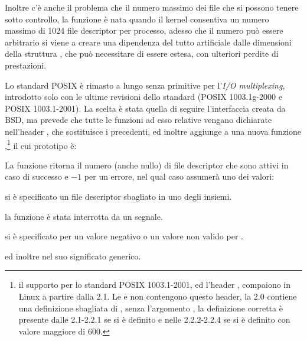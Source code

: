 Inoltre c'è anche il problema che il numero massimo dei file che si possono
tenere sotto controllo, la funzione è nata quando il kernel consentiva un
numero massimo di 1024 file descriptor per processo, adesso che il numero può
essere arbitrario si viene a creare una dipendenza del tutto artificiale dalle
dimensioni della struttura , che può necessitare di essere
estesa, con ulteriori perdite di prestazioni. 

Lo standard POSIX è rimasto a lungo senza primitive per l'\textit{I/O
  multiplexing}, introdotto solo con le ultime revisioni dello standard (POSIX
1003.1g-2000 e POSIX 1003.1-2001). La scelta è stata quella di seguire
l'interfaccia creata da BSD, ma prevede che tutte le funzioni ad esso relative
vengano dichiarate nell'header , che sostituisce i
precedenti, ed inoltre aggiunge a  una nuova funzione
,\footnote{il supporto per lo standard POSIX 1003.1-2001, ed
  l'header , compaiono in Linux a partire dalla
   2.1. Le  e  non contengono questo header,
  la  2.0 contiene una definizione sbagliata di ,
  senza l'argomento , la definizione corretta è presente dalle
   2.1-2.2.1 se si è definito  e nelle
   2.2.2-2.2.4 se si è definito  con valore
  maggiore di 600.} il cui prototipo è:

\begin{funcproto}{
}
{La funzione ritorna il numero (anche nullo) di file descriptor che sono
  attivi in caso di successo e $-1$ per un errore, nel qual caso 
  assumerà uno dei valori:
  \begin{errlist}
  \item[\errcode{EBADF}] si è specificato un file descriptor sbagliato in uno
    degli insiemi.
  \item[\errcode{EINTR}] la funzione è stata interrotta da un segnale.
  \item[\errcode{EINVAL}] si è specificato per  un valore negativo
    o un valore non valido per .
   \end{errlist}
   ed inoltre  nel suo significato generico.
}
\end{funcproto}

